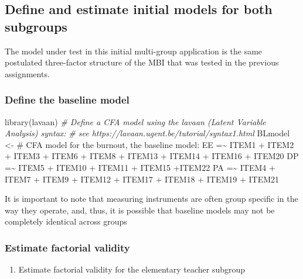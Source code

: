 \documentclass[
]{article}
\newenvironment{Shaded}{\begin{snugshade}}{\end{snugshade}}
\newcommand{\CommentTok}[1]{\textcolor[rgb]{0.56,0.35,0.01}{\textit{#1}}}
\newcommand{\FunctionTok}[1]{\textcolor[rgb]{0.00,0.00,0.00}{#1}}
\newcommand{\NormalTok}[1]{#1}
\newcommand{\OtherTok}[1]{\textcolor[rgb]{0.56,0.35,0.01}{#1}}
\newcommand{\StringTok}[1]{\textcolor[rgb]{0.31,0.60,0.02}{#1}}
\providecommand{\tightlist}{%
  \setlength{\itemsep}{0pt}\setlength{\parskip}{0pt}}
\begin{document}
\hypertarget{define-and-estimate-initial-models-for-both-subgroups}{%
\subsection{Define and estimate initial models for both subgroups}\label{define-and-estimate-initial-models-for-both-subgroups}}

The model under test in this initial multi-group application is the same postulated three-factor structure of the MBI that was tested in the previous assignments.

\hypertarget{define-the-baseline-model}{%
\subsubsection{Define the baseline model}\label{define-the-baseline-model}}

\begin{Shaded}
\begin{Highlighting}[]
\FunctionTok{library}\NormalTok{(lavaan)}
\CommentTok{\# Define a CFA model using the lavaan (Latent Variable Analysis) syntax:}
\CommentTok{\# see https://lavaan.ugent.be/tutorial/syntax1.html}
\NormalTok{BLmodel }\OtherTok{\textless{}{-}} \StringTok{\textquotesingle{}}
\StringTok{\# CFA model for the burnout, the baseline model:}
\StringTok{    EE =\textasciitilde{} ITEM1 + ITEM2 + ITEM3 + ITEM6 + ITEM8 + }
\StringTok{          ITEM13 + ITEM14 + ITEM16 + ITEM20}
\StringTok{    DP =\textasciitilde{} ITEM5 + ITEM10 + ITEM11 + ITEM15 +ITEM22}
\StringTok{    PA =\textasciitilde{} ITEM4 + ITEM7 + ITEM9 + ITEM12 + }
\StringTok{          ITEM17 + ITEM18 + ITEM19 + ITEM21}
\StringTok{          \textquotesingle{}}
\end{Highlighting}
\end{Shaded}

It is important to note that measuring instruments are often group specific in the way they operate, and, thus, it is possible that baseline models may not be completely identical across groups

\hypertarget{estimate-factorial-validity}{%
\subsubsection{Estimate factorial validity}\label{estimate-factorial-validity}}

\begin{enumerate}
\def\labelenumi{(\arabic{enumi})}
\tightlist
\item
  Estimate factorial validity for the elementary teacher subgroup
\end{enumerate}
\end{document}
